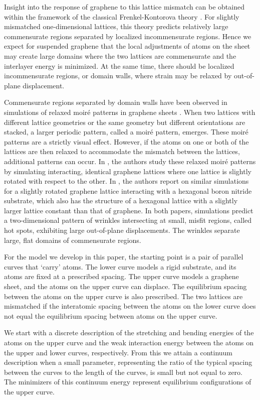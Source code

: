 \documentclass{siamltex}
\begin{document}
Insight into the response of graphene to this lattice
mismatch can be obtained within the framework of the classical
Frenkel-Kontorova theory \cite{braun2013frenkel}. 
For slightly mismatched one-dimensional lattices, this theory predicts
relatively large commensurate regions separated by localized
incommensurate regions.  Hence we expect for suspended graphene that
the local adjustments of atoms on the sheet may create large domains
where the two lattices are commensurate and the interlayer energy is
minimized.  At the same time, there should be localized incommensurate
regions, or domain walls, where strain may be relaxed by out-of-plane
displacement.


Commensurate regions separated by domain walls have been observed in
simulations of relaxed moir\'e patterns in graphene sheets
\cite{van2015relaxation,van2014moire}.  When two lattices with
different lattice geometries or the same geometry but different
orientations are stacked, a larger periodic pattern, called a moir\'e
pattern, emerges.  These moir\'e patterns are a strictly visual effect.
However, if the atoms on one or both of the lattices are then relaxed
to accommodate the mismatch between the lattices, additional patterns
can occur.  In \cite{van2015relaxation}, the authors study these
relaxed moir\'e patterns by simulating interacting, identical graphene
lattices where one lattice is slightly rotated with respect to the
other.  In \cite{van2014moire}, the authors report on similar
simulations for a slightly rotated graphene lattice interacting with a
hexagonal boron nitride substrate, which also has the structure of a
hexagonal lattice with a slightly larger lattice constant than that of
graphene.  In both papers, simulations predict a two-dimensional pattern {
of wrinkles intersecting at small, misfit regions, called hot spots, exhibiting large
out-of-plane displacements}. The {wrinkles} separate large, flat
domains of commensurate regions.


For the model we develop in this paper, the starting point is a pair
of parallel curves that `carry' atoms. The lower curve models a rigid
substrate, and its atoms are fixed at a prescribed spacing.
The upper curve models a graphene sheet, and the
atoms on the upper curve can displace.  The equilibrium spacing
between the atoms on the upper curve is also prescribed.  The two
lattices are mismatched if the interatomic spacing between the atoms on the lower curve
does not equal the equilibrium spacing between atoms on the upper
curve.


We start with a discrete description of the stretching and bending
energies of the atoms on the upper curve and the weak interaction
energy between the atoms on the upper and lower curves, respectively.  From
this we attain a continuum description when a small parameter,
representing the ratio of the typical spacing between the curves to
the length of the curves, is small but not equal to zero.  The minimizers of this
continuum energy represent equilibrium configurations of the upper
curve.  
\end{document}
